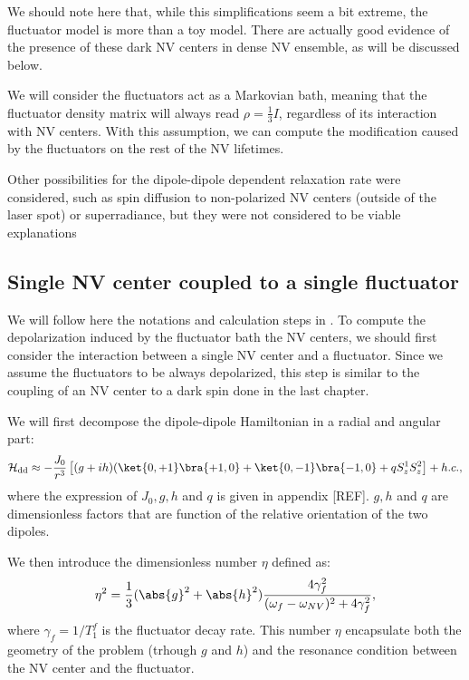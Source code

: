 \documentclass[a4paper,11pt]{report}
\begin{document}
We should note here that, while this simplifications seem a bit extreme, the fluctuator model is more than a toy model. There are actually good evidence of the presence of these dark NV centers in dense NV ensemble, as will be discussed below.

We will consider the fluctuators act as a Markovian bath, meaning that the fluctuator density matrix will always read $\rho = \frac{1}{3} I$, regardless of its interaction with NV centers. With this assumption, we can compute the modification caused by the fluctuators on the rest of the NV lifetimes.

Other possibilities for the dipole-dipole dependent relaxation rate were considered, such as spin diffusion to non-polarized NV centers (outside of the laser spot) or superradiance, but they were not considered to be viable explanations \citep{choi2017depolarization}

\subsection{Single NV center coupled to a single fluctuator}
We will follow here the notations and calculation steps in \citep{choi2017depolarization}. To compute the depolarization induced by the fluctuator bath the NV centers, we should first consider the interaction between a single NV center and a fluctuator. Since we assume the fluctuators to be always depolarized, this step is similar to the coupling of an NV center to a dark spin done in the last chapter.

We will first decompose the dipole-dipole Hamiltonian in a radial and angular part:
\begin{equation}
\mathcal{H}_{\rm dd} \approx - \frac{J_0}{r^3} \left[(g+ih)(\ket{0,+1}\bra{+1,0}+\ket{0,-1}\bra{-1,0}+qS_z^1 S_z^2 \right] + h.c. ,
\end{equation}
where the expression of $J_0, g, h$ and $q$ is given in appendix [REF]. $g, h$ and $q$ are dimensionless factors that are function of the relative orientation of the two dipoles.

We then introduce the dimensionless number $\eta$ defined as:
\begin{equation}
\eta^2=\frac{1}{3} (\abs{g}^2+\abs{h}^2)  \frac{4\gamma_f^2}{(\omega_f - \omega_{NV})^2+4\gamma_f^2},
\end{equation}
where $\gamma_f=1/T_1^f$ is the fluctuator decay rate. This number $\eta$ encapsulate both the geometry of the problem (trhough $g$ and $h$) and the resonance condition between the NV center and the fluctuator.
\end{document}
